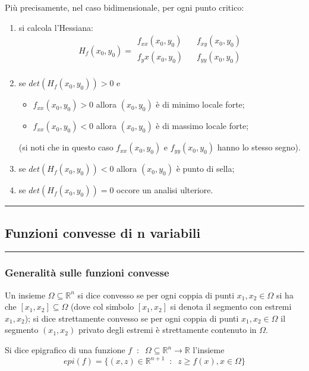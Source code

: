Più precisamente, nel caso bidimensionale, per ogni punto critico:
\begin{enumerate}
    \item si calcola l'Hessiana:
        \[
            H_f(x_0, y_0) = \begin{matrix}
                f_{xx}(x_0,y_0) \;\;\; & f_{xy}(x_0,y_0)\\
                f_yx(x_0,y_0) \;\;\; & f_{yy}(x_0,y_0)\\
            \end{matrix}
        \]
    \item se $det(H_f(x_0, y_0)) > 0$ e
        \begin{itemize}
            \item $f_{xx}(x_0,y_0)>0$ allora $(x_0, y_0)$ è di minimo locale forte;
            \item $f_{xx}(x_0,y_0)<0$ allora $(x_0, y_0)$ è di massimo locale forte;
        \end{itemize}
        (si noti che in questo caso $f_{xx}(x_0,y_0)$ e $f_{yy}(x_0,y_0)$ hanno lo stesso segno).
    \item se $det(H_f(x_0, y_0)) < 0$ allora $(x_0, y_0)$ è punto di sella;
    \item se $det(H_f(x_0, y_0)) = 0$ occore un analisi ulteriore. 
\end{enumerate}
\rule{\textwidth}{2pt}
\subsection*{Funzioni convesse di n variabili}
\rule{\textwidth}{0.4pt}
\subsubsection*{Generalità sulle funzioni convesse}
Un insieme $\Omega \subseteq \mathbb{R}^n$ si dice convesso se per ogni coppia di punti $x_1, x_2 \in \Omega$ si ha che $[x_1,x_2]\subseteq \Omega$ (dove col simbolo $[x_1,x_2]$ si denota il segmento con estremi $x_1,x_2$); si dice strettamente convesso se per ogni coppia di punti $x_1,x_2 \in \Omega$ il segmento $(x_1,x_2)$ privato degli estremi è strettamente contenuto in $\Omega$.\newline

Si dice epigrafico di una funzione $f \;\;:\;\; \Omega \subseteq \mathbb{R}^n \rightarrow  \mathbb{R}$ l'insieme
\[
    epi(f)=\{(x,z) \in \mathbb{R}^{n+1} \;\;:\;\; z\geq f(x), x \in\Omega\}
\]
\newline

